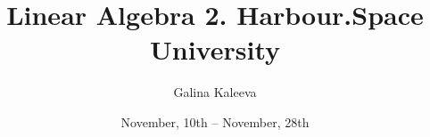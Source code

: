 \documentclass{article}
\begin{document}
\title{Linear Algebra 2. Harbour.Space University}
\author{Galina Kaleeva}
\date{November, 10th -- November, 28th}
	
\maketitle
\tableofcontents

\setcounter{section}{-1}

%
%
%
%

%
%










\end{document}

